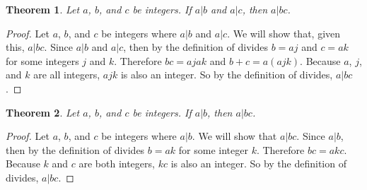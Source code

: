 \documentclass[12pt,leqno]{article}
\numberwithin{equation}{section}
\newtheorem{thm}{Theorem}[section]
\theoremstyle{definition}
\begin{document}
\begin{thm}
Let $a$, $b$, and $c$ be integers. If $a|b$ and $a|c$, then $a|bc$.
\end{thm}

\begin{proof}[Proof]
Let $a$, $b$, and $c$ be integers where $a|b$ and $a|c$.  We will show that, given this, $a|bc$.  Since $a|b$ and $a|c$, then by the definition of divides $b = aj$ and $c = ak$ for some integers $j$ and $k$.  Therefore $bc = ajak$ and $b + c = a(ajk)$.  Because $a$, $j$, and $k$ are all integers, $ajk$ is also an integer.  So by the definition of divides, $a|bc$.\end{proof}

\setcounter{thm}{5}

\begin{thm}
Let $a$, $b$, and $c$ be integers. If $a|b$, then $a|bc$.
\end{thm}

\begin{proof}[Proof]
Let $a$, $b$, and $c$ be integers where $a|b$.  We will show that $a|bc$.  Since $a|b$, then by the definition of divides $b = ak$ for some integer $k$.  Therefore $bc = akc$. Because $k$ and $c$ are both integers, $kc$ is also an integer.  So by the definition of divides, $a|bc$.
\end{proof}
\end{document}
